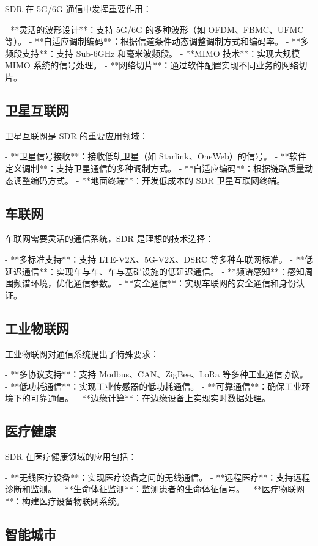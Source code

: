 \documentclass[UTF8]{ctexbook}
\begin{document}
SDR 在 5G/6G 通信中发挥重要作用：

- **灵活的波形设计**：支持 5G/6G 的多种波形（如 OFDM、FBMC、UFMC 等）。
- **自适应调制编码**：根据信道条件动态调整调制方式和编码率。
- **多频段支持**：支持 Sub-6GHz 和毫米波频段。
- **MIMO 技术**：实现大规模 MIMO 系统的信号处理。
- **网络切片**：通过软件配置实现不同业务的网络切片。

\subsection{卫星互联网}

卫星互联网是 SDR 的重要应用领域：

- **卫星信号接收**：接收低轨卫星（如 Starlink、OneWeb）的信号。
- **软件定义调制**：支持卫星通信的多种调制方式。
- **自适应编码**：根据链路质量动态调整编码方式。
- **地面终端**：开发低成本的 SDR 卫星互联网终端。

\subsection{车联网}

车联网需要灵活的通信系统，SDR 是理想的技术选择：

- **多标准支持**：支持 LTE-V2X、5G-V2X、DSRC 等多种车联网标准。
- **低延迟通信**：实现车与车、车与基础设施的低延迟通信。
- **频谱感知**：感知周围频谱环境，优化通信参数。
- **安全通信**：实现车联网的安全通信和身份认证。

\subsection{工业物联网}

工业物联网对通信系统提出了特殊要求：

- **多协议支持**：支持 Modbus、CAN、ZigBee、LoRa 等多种工业通信协议。
- **低功耗通信**：实现工业传感器的低功耗通信。
- **可靠通信**：确保工业环境下的可靠通信。
- **边缘计算**：在边缘设备上实现实时数据处理。

\subsection{医疗健康}

SDR 在医疗健康领域的应用包括：

- **无线医疗设备**：实现医疗设备之间的无线通信。
- **远程医疗**：支持远程诊断和监测。
- **生命体征监测**：监测患者的生命体征信号。
- **医疗物联网**：构建医疗设备物联网系统。

\subsection{智能城市}
\end{document}
